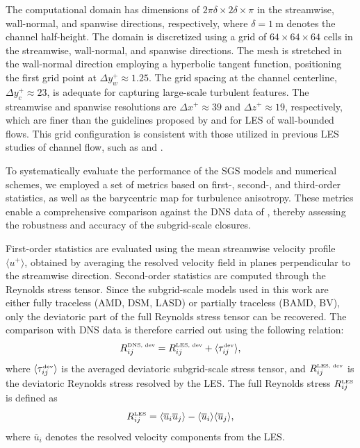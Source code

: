 \documentclass[final,3p]{elsarticle}
\begin{document}
The computational domain has dimensions of $2\pi \delta \times 2\delta \times \pi$ in the streamwise, wall-normal, and spanwise directions, respectively, where $\delta = 1~\mathrm{m}$ denotes the channel half-height. The domain is discretized using a grid of $64 \times 64 \times 64$ cells in the streamwise, wall-normal, and spanwise directions. The mesh is stretched in the wall-normal direction employing a hyperbolic tangent function, positioning the first grid point at $\Delta y_w^+ \approx 1.25$. The grid spacing at the channel centerline, $\Delta y_c^+ \approx 23$, is adequate for capturing large-scale turbulent features. The streamwise and spanwise resolutions are $\Delta x^+ \approx 39$ and $\Delta z^+ \approx 19$, respectively, which are finer than the guidelines proposed by \citet{georgiadis2010large} and \citet{choi2012grid} for LES of wall-bounded flows. This grid configuration is consistent with those utilized in previous LES studies of channel flow, such as \citet{streher2021mixed} and \citet{rozema2022local}.

To systematically evaluate the performance of the SGS models and numerical schemes, we employed a set of metrics based on first-, second-, and third-order statistics, as well as the barycentric map for turbulence anisotropy. These metrics enable a comprehensive comparison against the DNS data of \citet{moser1999direct}, thereby assessing the robustness and accuracy of the subgrid-scale closures.

First-order statistics are evaluated using the mean streamwise velocity profile $\langle u^+\rangle$, obtained by averaging the resolved velocity field in planes perpendicular to the streamwise direction. Second-order statistics are computed through the Reynolds stress tensor. Since the subgrid-scale models used in this work are either fully traceless (AMD, DSM, LASD) or partially traceless (BAMD, BV), only the deviatoric part of the full Reynolds stress tensor can be recovered. The comparison with DNS data is therefore carried out using the following relation:
\begin{equation}
	R_{ij}^{\hbox{\tiny DNS, dev}} = R_{ij}^{\hbox{\tiny LES, dev}} + \langle \tau_{ij}^{\hbox{\tiny dev}} \rangle,
\end{equation}
where $\langle \tau_{ij}^{\hbox{\tiny dev}} \rangle$ is the averaged deviatoric subgrid-scale stress tensor, and $R_{ij}^{\hbox{\tiny LES, dev}}$ is the  deviatoric Reynolds stress resolved by the LES. The full Reynolds stress $R_{ij}^{\hbox{\tiny LES}}$ is defined as
\begin{equation}
	R_{ij}^{\hbox{\tiny LES}} = \langle \overline{u}_i \overline{u}_j \rangle - \langle \overline{u}_i \rangle \langle \overline{u}_j \rangle,
\end{equation}
where $\overline{u}_i$ denotes the resolved velocity components from the LES.
\end{document}
